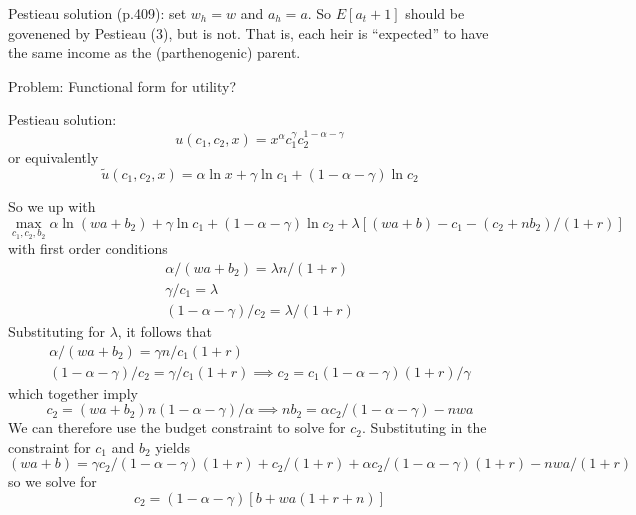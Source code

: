 \documentclass{article}
\begin{document}
Pestieau solution (p.409): set $w_{h}=w$ and $a_{h}=a$.
So $E[a_t+1]$ should be govenened by Pestieau (3), but is not.
That is, each heir is ``expected'' to have the same income as the (parthenogenic) parent.

Problem: Functional form for utility?

Pestieau solution:
\begin{equation}
u(c_{1}, c_{2}, x) = x^{\alpha} c_{1}^{\gamma} c_{2}^{1-\alpha-\gamma}
\end{equation}
or equivalently
\begin{equation}
\tilde{u}(c_{1}, c_{2}, x) = \alpha \ln x +\gamma \ln c_{1} + (1-\alpha-\gamma) \ln c_{2}
\end{equation}


So we up with
\begin{equation}
\max_{c_{1}, c_{2}, b_{2}}
\alpha \ln (wa+ b_{2}) 
+ \gamma \ln c_{1}
+ (1-\alpha-\gamma) \ln c_{2}
+ \lambda [ (w a + b) - c_{1} - (c_{2} + n b_{2})/(1+r)]
\end{equation}
with first order conditions
\begin{gather}
\alpha/(wa+b_{2}) = \lambda n/(1+r)
\\
\gamma/c_{1} = \lambda
\\
(1-\alpha-\gamma)/ c_{2} = \lambda / (1+r)
\end{gather}
Substituting for $\lambda$, it follows that
\begin{gather}
\alpha/(wa+b_{2}) = \gamma n/ c_{1} (1+r)
\\
(1-\alpha-\gamma)/ c_{2} = \gamma / c_{1} (1+r)  \implies  c_{2} = c_{1} (1-\alpha-\gamma)(1+r)/\gamma 
\end{gather}
which together imply
\begin{equation}
c_{2} = (wa+b_{2})n(1-\alpha-\gamma)/\alpha \implies n b_{2} = \alpha c_{2} /(1-\alpha-\gamma)  - nwa
\end{equation}
We can therefore use the budget constraint to solve for $c_{2}$.
Substituting in the constraint for $c_{1}$ and $b_{2}$ yields
\begin{equation}
(w a + b) = \gamma c_{2}/(1-\alpha-\gamma)(1+r) + c_{2}/(1+r) + \alpha c_{2}/(1-\alpha-\gamma)(1+r) - nwa/(1+r) 
\end{equation}
so we solve for
\begin{equation}
c_{2} = (1-\alpha-\gamma)[b + wa(1+r+n)]
\end{equation}
\end{document}
